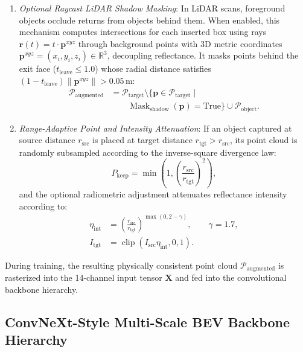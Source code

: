 \begin{enumerate}
\item \textit{Optional Raycast LiDAR Shadow Masking}: In LiDAR scans, foreground objects occlude returns from objects behind them. When enabled, this mechanism computes intersections for each inserted box using rays $\mathbf{r}(t) = t \cdot \mathbf{p}^{xyz}$ through background points with 3D metric coordinates $\mathbf{p}^{xyz} = (x_i, y_i, z_i) \in \mathbb{R}^3$, decoupling reflectance. It masks points behind the exit face ($t_{\mathrm{leave}} \le 1.0$) whose radial distance satisfies $(1 - t_{\mathrm{leave}})\|\mathbf{p}^{xyz}\| > 0.05$\,m:
\begin{equation}
    \begin{aligned}
        \mathcal{P}_{\mathrm{augmented}}
        &= \mathcal{P}_{\mathrm{target}} \setminus
        \{\mathbf{p} \in \mathcal{P}_{\mathrm{target}} \mid \\
        &\qquad \operatorname{Mask}_{\mathrm{shadow}}(\mathbf{p}) = \mathrm{True}\}
        \cup \mathcal{P}_{\mathrm{object}}.
    \end{aligned}
    \label{eq:shadow_mask}
\end{equation}

\item \textit{Range-Adaptive Point and Intensity Attenuation}: If an object captured at source distance $r_{\mathrm{src}}$ is placed at target distance $r_{\mathrm{tgt}} > r_{\mathrm{src}}$, its point cloud is randomly subsampled according to the inverse-square divergence law:
\begin{equation}
    P_{\mathrm{keep}} = \min\left(1, \left(\frac{r_{\mathrm{src}}}{r_{\mathrm{tgt}}}\right)^2\right),
    \label{eq:inverse_square}
\end{equation}
and the optional radiometric adjustment attenuates reflectance intensity according to:
\[
    \begin{aligned}
        \eta_{\mathrm{int}}
        &= \left(\frac{r_{\mathrm{src}}}{r_{\mathrm{tgt}}}\right)^{\max(0, 2 - \gamma)},
        \qquad \gamma = 1.7, \\
        I_{\mathrm{tgt}}
        &= \operatorname{clip}(I_{\mathrm{src}}\eta_{\mathrm{int}}, 0, 1).
    \end{aligned}
\]
\end{enumerate}
During training, the resulting physically consistent point cloud $\mathcal{P}_{\mathrm{augmented}}$ is rasterized into the 14-channel input tensor $\mathbf{X}$ and fed into the convolutional backbone hierarchy.

\subsection{ConvNeXt-Style Multi-Scale BEV Backbone Hierarchy}
\label{sec:backbone_architecture}

